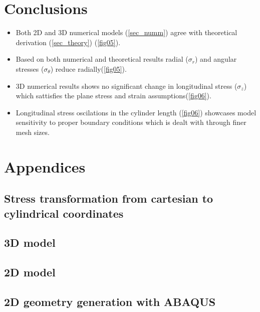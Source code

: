 \documentclass[11pt]{article} %
\newcommand\pcref[1]{(\cref{#1})}
\begin{document}
\section{Conclusions}
\begin{itemize} 
\item Both 2D and 3D numerical models \pcref{sec_numm} agree with theoretical derivation \pcref{sec_theory} \pcref{fig05}.
\item Based on both numerical and theoretical results radial ($\sigma_r$) and angular stresses ($\sigma_\theta$) reduce radially\pcref{fig05}.
\item 3D numerical results shows no significant change in longitudinal stress ($\sigma_z$) which sattisfies the plane stress and strain assumptions\pcref{fig06}.
\item Longitudinal stress oscilations in the cylinder length \pcref{fig06} showcases model sensitivity to proper boundary conditions which is dealt with through finer mesh sizes.
\end{itemize}
\newpage
\section{Appendices}\subsection{Stress transformation from cartesian to cylindrical coordinates}

\subsection{3D model}

\subsection{2D model}

\subsection{2D geometry generation with ABAQUS}
%



\end{document}
